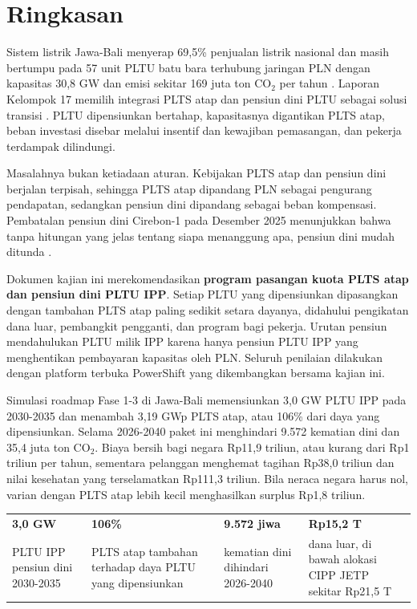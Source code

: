 \section*{Ringkasan}

Sistem listrik Jawa-Bali menyerap 69,5\% penjualan listrik nasional \cite{D-PLN-STAT-2025} dan masih bertumpu pada 57 unit PLTU batu bara terhubung jaringan PLN dengan kapasitas 30,8 GW dan emisi sekitar 169 juta ton CO$_2$ per tahun \cite{D-GEM-GCPT}. Laporan Kelompok 17 memilih integrasi PLTS atap dan pensiun dini PLTU sebagai solusi transisi \cite{L-LAPORAN-K17}. PLTU dipensiunkan bertahap, kapasitasnya digantikan PLTS atap, beban investasi disebar melalui insentif dan kewajiban pemasangan, dan pekerja terdampak dilindungi.

Masalahnya bukan ketiadaan aturan. Kebijakan PLTS atap dan pensiun dini berjalan terpisah, sehingga PLTS atap dipandang PLN sebagai pengurang pendapatan, sedangkan pensiun dini dipandang sebagai beban kompensasi. Pembatalan pensiun dini Cirebon-1 pada Desember 2025 menunjukkan bahwa tanpa hitungan yang jelas tentang siapa menanggung apa, pensiun dini mudah ditunda \cite{B-BISNIS-CIREBON-BATAL-2025}.

Dokumen kajian ini merekomendasikan \textbf{program pasangan kuota PLTS atap dan pensiun dini PLTU IPP}. Setiap PLTU yang dipensiunkan dipasangkan dengan tambahan PLTS atap paling sedikit setara dayanya, didahului pengikatan dana luar, pembangkit pengganti, dan program bagi pekerja. Urutan pensiun mendahulukan PLTU milik IPP karena hanya pensiun PLTU IPP yang menghentikan pembayaran kapasitas oleh PLN. Seluruh penilaian dilakukan dengan platform terbuka PowerShift yang dikembangkan bersama kajian ini.

Simulasi roadmap Fase 1-3 di Jawa-Bali memensiunkan 3,0 GW PLTU IPP pada 2030-2035 dan menambah 3,19 GWp PLTS atap, atau 106\% dari daya yang dipensiunkan. Selama 2026-2040 paket ini menghindari 9.572 kematian dini dan 35,4 juta ton CO$_2$. Biaya bersih bagi negara Rp11,9 triliun, atau kurang dari Rp1 triliun per tahun, sementara pelanggan menghemat tagihan Rp38,0 triliun dan nilai kesehatan yang terselamatkan Rp111,3 triliun. Bila neraca negara harus nol, varian dengan PLTS atap lebih kecil menghasilkan surplus Rp1,8 triliun.

\begin{center}
\small
\begin{tabularx}{\textwidth}{*{4}{>{\centering\arraybackslash}X}}
\toprule
\textbf{3,0 GW} & \textbf{106\%} & \textbf{9.572 jiwa} & \textbf{Rp15,2 T} \\
PLTU IPP pensiun dini 2030-2035 & PLTS atap tambahan terhadap daya PLTU yang dipensiunkan & kematian dini dihindari 2026-2040 & dana luar, di bawah alokasi CIPP JETP sekitar Rp21,5 T \\
\bottomrule
\end{tabularx}
\end{center}
